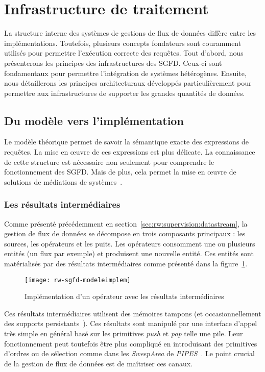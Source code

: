 \section{Infrastructure de traitement}\label{sec:rw:sgfd:infra}
La structure interne des systèmes de gestions de flux de données diffère entre les implémentations. Toutefois, plusieurs concepts fondateurs sont couramment utilisés pour permettre l'exécution correcte des requêtes. Tout d'abord, nous présenterons les principes des infrastructures des SGFD. Ceux-ci sont fondamentaux pour permettre l'intégration de systèmes hétérogènes. Ensuite, nous détaillerons les principes architecturaux développés particulièrement pour permettre aux infrastructures de supporter les grandes quantités de données.

\subsection{Du modèle vers l'implémentation}
Le modèle théorique permet de savoir la sémantique exacte des expressions de requêtes. La mise en œuvre de ces expressions est plus délicate. La connaissance de cette structure est nécessaire non seulement pour comprendre le fonctionnement des SGFD. Mais de plus, cela permet la mise en œuvre de solutions de médiations de systèmes~\cite{Tatbul:integration}.

\subsubsection{Les résultats intermédiaires}
Comme présenté précédemment en section~\ref{sec:rw:supervision:datastream}, la gestion de flux de données se décompose en trois composants principaux : les sources, les opérateurs et les puits. Les opérateurs consomment une ou plusieurs entités (un flux par exemple) et produisent une nouvelle entité. Ces entités sont matérialisés par des résultats intermédiaires comme présenté dans la figure~\ref{fig:rw:sgfd:modeleimplem}.
\begin{figure}[ht]
    \centering
    \texttt{[image: rw-sgfd-modeleimplem]}
    \caption{Implémentation d'un opérateur avec les résultats intermédiaires}\label{fig:rw:sgfd:modeleimplem}
\end{figure}

Ces résultats intermédiaires utilisent des mémoires tampons (et occasionnellement des supports persistants~\cite{Abadi:aurora}). Ces résultats sont manipulé par une interface d'appel très simple en général basé sur les primitives \textit{push} et \textit{pop} telle une pile. Leur fonctionnement peut toutefois être plus compliqué en introduisant des primitives d'ordres ou de sélection comme dans les \textit{SweepArea} de \textit{PIPES}~\cite{Kramer:semantics}. Le point crucial de la gestion de flux de données est de maîtriser ces canaux.

